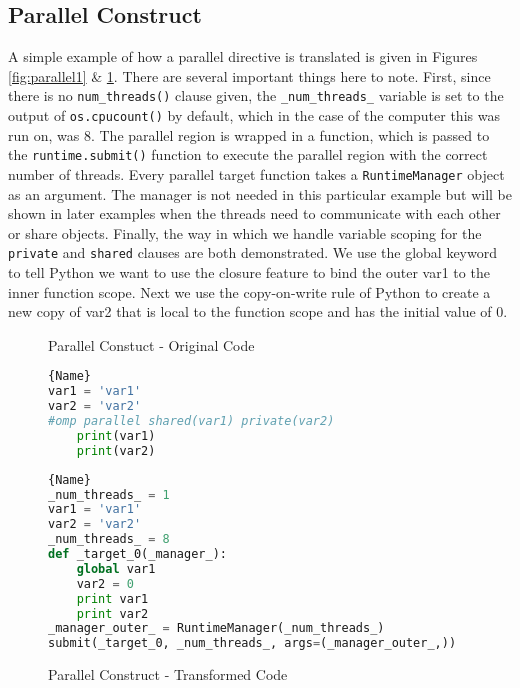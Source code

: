 \documentclass[letterpaper,12pt]{article} %
\begin{document}
\subsection{Parallel Construct}
A simple example of how a parallel directive is translated is given in Figures \ref{fig:parallel1} \& \ref{fig:parallel2}. There are several important things here to note. First, since there is no \texttt{num\_threads()} clause given, the \texttt{\_num\_threads\_} variable is set to the output of \texttt{os.cpucount()} by default, which in the case of the computer this was run on, was 8. The parallel region is wrapped in a function, which is passed to the \texttt{runtime.submit()} function to execute the parallel region with the correct number of threads. Every parallel target function takes a \texttt{RuntimeManager} object as an argument. The manager is not needed in this particular example but will be shown in later examples when the threads need to communicate with each other or share objects. Finally, the way in which we handle variable scoping for the \texttt{private} and \texttt{shared} clauses are both demonstrated. We use the global keyword to tell Python we want to use the closure feature to bind the outer var1 to the inner function scope. Next we use the copy-on-write rule of Python to create a new copy of var2 that is local to the function scope and has the initial value of 0.  


\begin{figure}[H]
\caption{Parallel Constuct - Original Code}
\label{fig:parallel1}
\begin{lstlisting}[language=Python]{Name}
var1 = 'var1'
var2 = 'var2'
#omp parallel shared(var1) private(var2)
    print(var1)
    print(var2)
\end{lstlisting}

\caption{Parallel Construct - Transformed Code}
\label{fig:parallel2}
\begin{lstlisting}[language=Python]{Name}
_num_threads_ = 1
var1 = 'var1'
var2 = 'var2'
_num_threads_ = 8
def _target_0(_manager_):
    global var1
    var2 = 0
    print var1
    print var2
_manager_outer_ = RuntimeManager(_num_threads_)
submit(_target_0, _num_threads_, args=(_manager_outer_,))
\end{lstlisting}
\end{figure}
\end{document}
